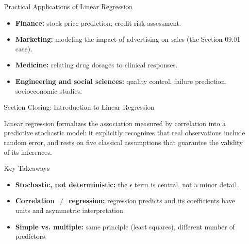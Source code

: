 \documentclass[10pt, aspectratio=169]{beamer}
\begin{document}
\begin{frame}{Practical Applications of Linear Regression}
  \footnotesize
  \begin{itemize}\itemsep=0.1cm
    \item \textbf{Finance:} stock price prediction, credit risk assessment. \pause
    \item \textbf{Marketing:} modeling the impact of advertising on sales (the Section 09.01 case). \pause
    \item \textbf{Medicine:} relating drug dosages to clinical responses. \pause
    \item \textbf{Engineering and social sciences:} quality control, failure prediction, socioeconomic studies.
  \end{itemize}
\end{frame}

\begin{frame}{Section Closing: Introduction to Linear Regression}
  \begin{reflexion}
    Linear regression formalizes the association measured by correlation into a predictive stochastic model: it explicitly recognizes that real observations include random error, and rests on five classical assumptions that guarantee the validity of its inferences.
  \end{reflexion}

  \vspace{0.2cm}
  \pause
  \begin{block}{Key Takeaways}
    \begin{itemize}\itemsep=0.08cm
      \item \textbf{Stochastic, not deterministic:} the $\epsilon$ term is central, not a minor detail.
      \item \textbf{Correlation $\neq$ regression:} regression predicts and its coefficients have units and asymmetric interpretation.
      \item \textbf{Simple vs. multiple:} same principle (least squares), different number of predictors.
    \end{itemize}
  \end{block}
\end{frame}
\end{document}
